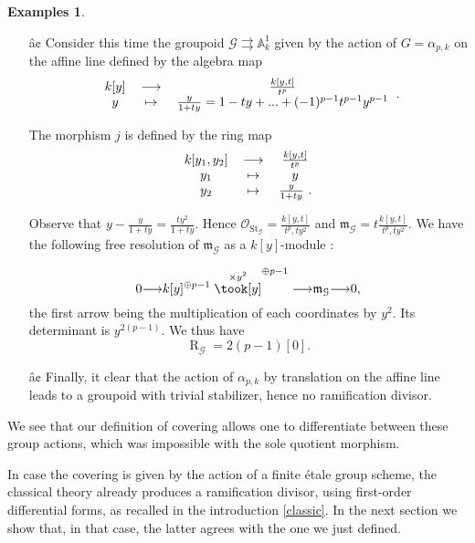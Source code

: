 \documentclass{amsart}
\theoremstyle{definition}
\newtheorem{exams}{Examples}[section]
\theoremstyle{remark}
\begin{document}
\begin{exams}
\begin{itemize}
\item[â¢] Consider this time the groupoid ${{\mathcal G}} {\rightrightarrows} {\mathbb{A}}^1_k$ given by the action of $G = \alpha_{p,k}$ on the affine line defined by the algebra map
\[ \begin{tabular}{ccc}
 
$k[y]$ & ${\longrightarrow}$ & $\frac{k[y,t]}{t^p}$ \\ 
 
$y$ & $\mapsto$ & $\frac{y}{1+ty} = 1 -ty +...+ (-1)^{p-1}t^{p-1}y^{p-1}$ \\ 
 
\end{tabular}. \]

The morphism $j$ is defined by the ring map \[ \begin{tabular}{ccc}

$k[y_1,y_2]$ & ${\longrightarrow}$ & $\frac{k[y,t]}{t^p}$ \\ 

$y_1$ & $\mapsto$ & $y$ \\ 

$y_2$ & $\mapsto$ & $\frac{y}{1+ty}$ .\\
\end{tabular} \]

Observe that $y-\frac{y}{1+ty} = \frac{ty^2}{1+ty}$. Hence ${{\mathcal O}}_{\operatorname{St}_{{\mathcal G}}} = \frac{k[y,t]}{t^p,ty^2}$ and ${{\mathfrak m}}_{{\mathcal G}} = t\frac{k[y,t]}{t^p,ty^2}$.
We have the following free resolution of ${{\mathfrak m}}_{{\mathcal G}}$ as a $k[y]$-module : 

\[ 0 {\longrightarrow} k[y]^{\oplus p-1} \stackrel{\times y^2}\took[y]^{\oplus p-1} {\longrightarrow} {{\mathfrak m}}_{{\mathcal G}} {\longrightarrow} 0 ,\] the first arrow being the multiplication of each coordinates by $y^2$. Its determinant is $y^{2(p-1)}$. We thus have \[\operatorname{R}_{{\mathcal G}} = 2(p-1)[0].\]

\item[â¢] Finally, it clear that the action of $\alpha_{p,k}$ by translation on the affine line leads to a groupoid with trivial stabilizer, hence no ramification divisor.
\end{itemize}

We see that our definition of covering allows one to differentiate between these group actions, which was impossible with the sole quotient morphism.
\end{exams}

In case the covering is given by the action of a finite \'etale group scheme, the classical theory already produces a ramification divisor, using first-order differential forms, as recalled in the introduction \ref{classic}. In the next section we show that, in that case, the latter agrees with the one we just defined.
\end{document}
